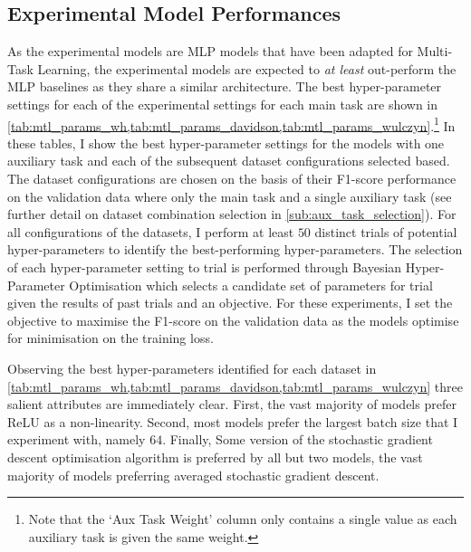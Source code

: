 \subsection{Experimental Model Performances}
As the experimental models are MLP models that have been adapted for Multi-Task Learning, the experimental models are expected to \textit{at least} out-perform the MLP baselines as they share a similar architecture.
The best hyper-parameter settings for each of the experimental settings for each main task are shown in \cref{tab:mtl_params_wh,tab:mtl_params_davidson,tab:mtl_params_wulczyn}.\footnote{Note that the `Aux Task Weight' column only contains a single value as each auxiliary task is given the same weight.}
In these tables, I show the best hyper-parameter settings for the models with one auxiliary task and each of the subsequent dataset configurations selected based.
The dataset configurations are chosen on the basis of their F1-score performance on the validation data where only the main task and a single auxiliary task (see further detail on dataset combination selection in \cref{sub:aux_task_selection}).
For all configurations of the datasets, I perform at least $50$ distinct trials of potential hyper-parameters to identify the best-performing hyper-parameters.
The selection of each hyper-parameter setting to trial is performed through Bayesian Hyper-Parameter Optimisation which selects a candidate set of parameters for trial given the results of past trials and an objective.
For these experiments, I set the objective to maximise the F1-score on the validation data as the models optimise for minimisation on the training loss.

Observing the best hyper-parameters identified for each dataset in \cref{tab:mtl_params_wh,tab:mtl_params_davidson,tab:mtl_params_wulczyn} three salient attributes are immediately clear.
First, the vast majority of models prefer ReLU as a non-linearity.
Second, most models prefer the largest batch size that I experiment with, namely $64$.
Finally, Some version of the stochastic gradient descent optimisation algorithm is preferred by all but two models, the vast majority of models preferring averaged stochastic gradient descent.

